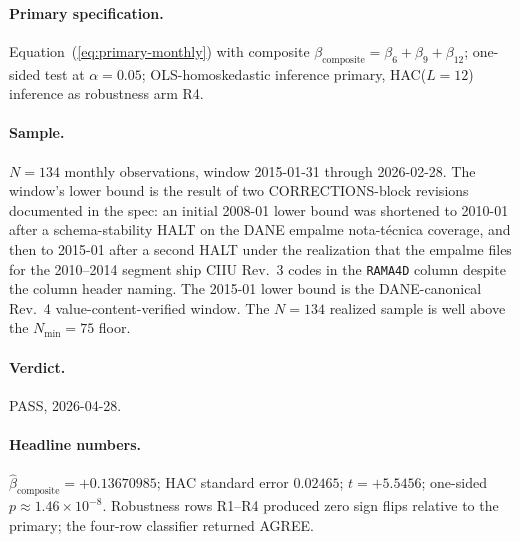 \paragraph{Primary specification.} Equation~(\ref{eq:primary-monthly})
with composite \(\beta_{\mathrm{composite}} = \beta_6 + \beta_9 +
\beta_{12}\); one-sided test at \(\alpha = 0.05\); OLS-homoskedastic
inference primary, HAC(\(L = 12\)) inference as robustness arm R4.

\paragraph{Sample.} \(N = 134\) monthly observations, window
2015-01-31 through 2026-02-28. The window's lower bound is the result
of two CORRECTIONS-block revisions documented in the spec: an initial
2008-01 lower bound was shortened to 2010-01 after a schema-stability
HALT on the DANE empalme nota-técnica coverage, and then to 2015-01
after a second HALT under the realization that the empalme files for
the 2010--2014 segment ship CIIU Rev.~3 codes in the
\texttt{RAMA4D} column despite the column header naming. The
2015-01 lower bound is the DANE-canonical Rev.~4 value-content-verified
window. The \(N = 134\) realized sample is well above the
\(N_{\min} = 75\) floor.

\paragraph{Verdict.} PASS, 2026-04-28.

\paragraph{Headline numbers.} \(\hat{\beta}_{\mathrm{composite}} =
+0.13670985\); HAC standard error \(0.02465\); \(t = +5.5456\);
one-sided \(p \approx 1.46 \times 10^{-8}\). Robustness rows R1--R4
produced zero sign flips relative to the primary; the four-row classifier
returned AGREE.

